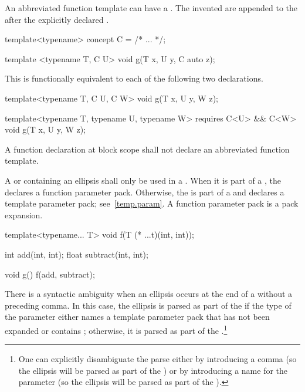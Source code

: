 \pnum
An abbreviated function template can have a .
The invented  are
appended to the  after
the explicitly declared .
\begin{example}
\begin{codeblock}
template<typename> concept C = /* ... */;

template <typename T, C U>
  void g(T x, U y, C auto z);
\end{codeblock}

This is functionally equivalent to each of the following two declarations.
\begin{codeblock}
template<typename T, C U, C W>
  void g(T x, U y, W z);

template<typename T, typename U, typename W>
  requires C<U> && C<W>
  void g(T x, U y, W z);
\end{codeblock}
\end{example}

\pnum
A function declaration at block scope
shall not declare an abbreviated function template.

\pnum
A  or 
containing an ellipsis shall only
be used in a .
When it is part of a
,
the  declares a
function parameter pack.
Otherwise, the  is part of a
 and declares a
template parameter pack; see~\ref{temp.param}.
A function parameter pack is a pack expansion.
\begin{example}
\begin{codeblock}
template<typename... T> void f(T (* ...t)(int, int));

int add(int, int);
float subtract(int, int);

void g() {
  f(add, subtract);
}
\end{codeblock}
\end{example}

\pnum
There is a syntactic ambiguity when an ellipsis occurs at the end
of a  without a preceding
comma. In this case, the ellipsis is parsed as part of the
 if the type of the parameter either names
a template parameter pack that has not been expanded or contains ;
otherwise, it is
parsed as part of the .\footnote{One can explicitly disambiguate the parse either by
introducing a comma (so the ellipsis will be parsed as part of the
) or by introducing a name for the
parameter (so the ellipsis will be parsed as part of the
).}%

